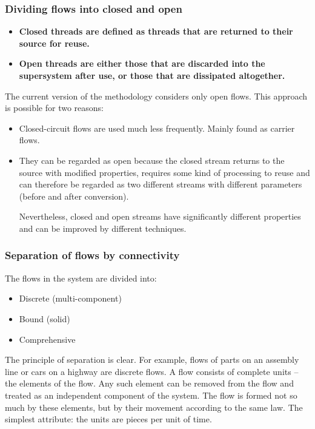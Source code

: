 \documentclass[a4paper,11pt]{article}
\begin{document}
\subsubsection{Dividing flows into closed and open}
\begin{itemize}
\item \textbf{Closed threads are defined as threads that are returned to their
  source for reuse.}
\item \textbf{Open threads are either those that are discarded into the
  supersystem after use, or those that are dissipated altogether.}
\end{itemize}
The current version of the methodology \cite{B9} considers only open flows.
This approach is possible for two reasons:
\begin{itemize}
\item Closed-circuit flows are used much less frequently. Mainly found as
  carrier flows.
\item They can be regarded as open because the closed stream returns to the
  source with modified properties, requires some kind of processing to reuse
  and can therefore be regarded as two different streams with different
  parameters (before and after conversion).

  Nevertheless, closed and open streams have significantly different
  properties and can be improved by different techniques.
\end{itemize}

\subsubsection{Separation of flows by connectivity}

The flows in the system are divided into:
\begin{itemize}
\item Discrete (multi-component)
\item Bound (solid)
\item Comprehensive
\end{itemize}
The principle of separation is clear. For example, flows of parts on an
assembly line or cars on a highway are discrete flows. A flow consists of
complete units -- the elements of the flow. Any such element can be removed
from the flow and treated as an independent component of the system. The flow
is formed not so much by these elements, but by their movement according to
the same law. The simplest attribute: the units are pieces per unit of time.
\end{document}
